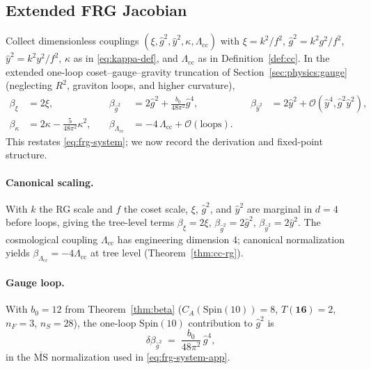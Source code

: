 \documentclass[11pt]{article}
\theoremstyle{plain}
\theoremstyle{definition}
\theoremstyle{remark}
\numberwithin{equation}{section}
\newcommand{\Spin}{\mathrm{Spin}}
\begin{document}
\subsection{Extended FRG Jacobian}
\label{sec:appendix:frg}

Collect dimensionless couplings
$(\xi,\hat g^2,\hat y^2,\kappa,\Lambda_{\mathrm{cc}})$ with
$\xi=k^2/f^2$, $\hat g^2=k^2 g^2/f^2$, $\hat y^2=k^2 y^2/f^2$,
$\kappa$ as in \eqref{eq:kappa-def}, and $\Lambda_{\mathrm{cc}}$ as in
Definition~\ref{def:cc}. In the extended one-loop coset--gauge--gravity
truncation of Section~\ref{sec:physics:gauge} (neglecting $R^2$, graviton
loops, and higher curvature),
\begin{equation}\label{eq:frg-system-app}
\begin{aligned}
  \beta_{\xi}&=2\xi,
  &\quad
  \beta_{\hat g^2}&=2\hat g^2+\frac{b_0}{48\pi^2}\hat g^4,
  &\quad
  \beta_{\hat y^2}&=2\hat y^2+\mathcal{O}(\hat y^4,\hat g^2\hat y^2),
  \\[4pt]
  \beta_{\kappa}&=2\kappa-\frac{5}{48\pi^2}\kappa^2,
  &\quad
  \beta_{\Lambda_{\mathrm{cc}}}&=-4\,\Lambda_{\mathrm{cc}}+\mathcal{O}(\text{loops}).
\end{aligned}
\end{equation}
This restates \eqref{eq:frg-system}; we now record the derivation and
fixed-point structure.

\paragraph{Canonical scaling.}
With $k$ the RG scale and $f$ the coset scale, $\xi$, $\hat g^2$, and
$\hat y^2$ are marginal in $d=4$ before loops, giving the tree-level terms
$\beta_{\xi}=2\xi$, $\beta_{\hat g^2}=2\hat g^2$, $\beta_{\hat y^2}=2\hat y^2$.
The cosmological coupling $\Lambda_{\mathrm{cc}}$ has engineering dimension
$4$; canonical normalization yields $\beta_{\Lambda_{\mathrm{cc}}}=-4\Lambda_{\mathrm{cc}}$
at tree level (Theorem~\ref{thm:cc-rg}).

\paragraph{Gauge loop.}
With $b_0=12$ from Theorem~\ref{thm:beta} ($C_A(\Spin(10))=8$,
$T(\mathbf{16})=2$, $n_F=3$, $n_S=28$), the one-loop $\Spin(10)$ contribution
to $\hat g^2$ is
\begin{equation}\label{eq:beta-g4}
  \delta\beta_{\hat g^2}
  \;=\;
  \frac{b_0}{48\pi^2}\,\hat g^4,
\end{equation}
in the $\overline{\mathrm{MS}}$ normalization used in \eqref{eq:frg-system-app}.
\end{document}
